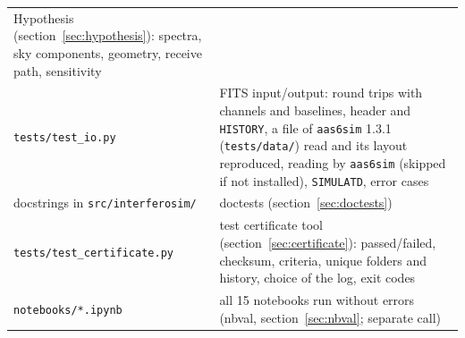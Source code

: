 \begin{longtable}{@{}l>{\raggedright\arraybackslash}p{8.4cm}@{}}
  Hypothesis (section~\ref{sec:hypothesis}): spectra, sky components,
  geometry, receive path, sensitivity \\  %
\texttt{tests/test\_io.py} & FITS input/output: round trips with
  channels and baselines, header and \texttt{HISTORY}, a file of
  \texttt{aas6sim} 1.3.1 (\texttt{tests/data/}) read and its layout
  reproduced, reading by \texttt{aas6sim} (skipped if not installed),
  \texttt{SIMULATD}, error cases \\  %
docstrings in \texttt{src/interferosim/} & 15 doctests
  (section~\ref{sec:doctests}) \\  %
\texttt{tests/test\_certificate.py} & test certificate tool
  (section~\ref{sec:certificate}): passed/failed, checksum, criteria,
  unique folders and history, choice of the log, exit codes \\  %
\texttt{notebooks/*.ipynb} & all 15 notebooks run without errors (nbval,
  section~\ref{sec:nbval}; separate call) \\  %
\end{longtable}
